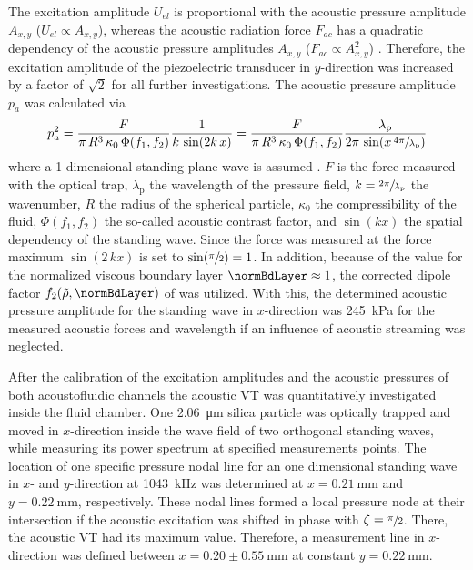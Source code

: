 The excitation amplitude $U_{el}$ is proportional with the acoustic pressure 
amplitude $A_{x,y}$ ($U_{el} \propto A_{x,y}$), whereas the acoustic radiation 
force $F_{ac}$ has a quadratic dependency of the acoustic pressure amplitudes 
$A_{x,y}$ ($F_{ac} \propto A_{x,y}^2$) \cite{Barnkob2}. Therefore, the 
excitation amplitude of the piezoelectric transducer in $y$-direction was 
increased by a factor of $\sqrt{2}$ for all further investigations. The acoustic 
pressure amplitude $p_{a}$ was calculated via
\begin{equation}
\label{eq:PressurePredictions}
p_{a}^{2} = \frac{F}{\pi\,R^{3}\,\kappa_{0}\,\Phi(f_{1},f_{2})} 
\frac{1}{k\,\sin(2k\,x)} =
\frac{F}{\pi\,R^{3}\,\kappa_{0}\,\Phi(f_{1},f_{2})} 
\frac{\lambda_{\text{p}}}{2\pi\,\sin(x\,\sfrac{4\pi}{\lambda_{\text{p}}})}
\end{equation}
where a 1-dimensional standing plane wave is assumed \cite{Bruus2012}. $F$ is 
the force measured with the optical trap, $\lambda_{\text{p}}$ the wavelength of 
the pressure field, $k = \sfrac{2\pi}{\lambda_{\text{p}}}$ the wavenumber, $R$ 
the radius of the spherical particle, $\kappa_{0}$ the compressibility of the 
fluid, $\Phi(f_{1},f_{2})$ the so-called acoustic contrast factor, and 
$\sin(kx)$ the spatial dependency of the standing wave.  Since the force was 
measured at the force maximum $\sin(2\,kx)$ is set to $\sin(\sfrac{\pi}{2}) = 
1$. In addition, because of the value for the normalized viscous boundary layer 
$\normBdLayer \approx 1$, the corrected dipole factor  
$f_{2}(\tilde{\rho},\normBdLayer)$ of \citeauthor{Settnes2012} 
\cite{Settnes2012} was utilized. With this, the determined acoustic pressure 
amplitude for the standing wave in $x$-direction was \SI{245}{\kilo\pascal} for 
the measured acoustic forces and wavelength if an influence of acoustic 
streaming was neglected. 

After the calibration of the excitation amplitudes and the acoustic pressures of 
both acoustofluidic channels the acoustic VT was quantitatively investigated 
inside the fluid chamber. One \SI{2.06}{\micro\meter} silica particle was 
optically trapped and moved in $x$-direction inside the wave field of two 
orthogonal standing waves, while measuring its power spectrum at specified 
measurements points. The location of one specific pressure nodal line for an one 
dimensional standing wave in $x$- and $y$-direction at \SI{1043}{\kilo\hertz} 
was determined at $x=\SI{0.21}{\mm}$ and $y=\SI{0.22}{\mm}$, respectively. These 
nodal lines formed a local pressure node at their intersection if the acoustic 
excitation was shifted in phase with $\zeta = \sfrac{\pi}{2}$. There, the 
acoustic VT had its maximum value. Therefore, a measurement line in 
$x$-direction was defined between $x=0.20\pm0.55~\si{\milli\meter}$ at constant 
$y=\SI{0.22}{\milli\meter}$.

